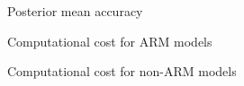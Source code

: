 \documentclass[8pt]{beamer}\usepackage[]{graphicx}\usepackage[]{color}
\begin{document}









\begin{frame}{Posterior mean accuracy}
    \PosteriorMeanAccuracy{}
\end{frame}


\begin{frame}{Computational cost for ARM models}
\RuntimeARM{}
\end{frame}


\begin{frame}{Computational cost for non-ARM models}
    \RuntimeNonARM{}
\end{frame}

\end{document}
